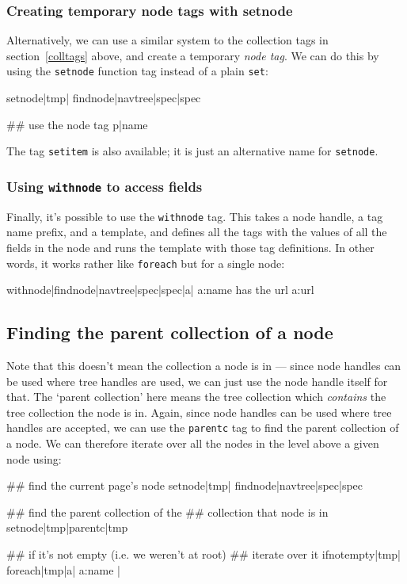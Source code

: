 \subsubsection{Creating temporary node tags with setnode}
\label{usenodetag}
Alternatively, we can use a similar system to the collection tags in section~\ref{colltags} above, and
create a temporary \emph{node tag}. We can do this by using the \texttt{setnode} function tag instead
of a plain \texttt{set}:
\begin{MyVerbatim}
{{setnode|tmp|
    {{findnode|{{navtree}}|spec|{{spec}}}}}}

## use the node tag
{{p|name}}
\end{MyVerbatim}
The tag \texttt{setitem} is also available; it is just an alternative name for \texttt{setnode}.

\subsubsection{Using \texttt{withnode} to access fields}
Finally, it's possible to use the \texttt{withnode} tag. This takes a node handle, a tag name prefix,
and a template, and defines all the tags with the values of all the fields in the node and runs
the template with those tag definitions. In other words, it works rather like \texttt{foreach} but for
a single node:
\begin{MyVerbatim}
{{withnode|{{findnode|{{navtree}}|spec|{{spec}}}}|a|
    {{a:name}} has the url {{a:url}}
}}
\end{MyVerbatim}

\subsection{Finding the parent collection of a node}
Note that this doesn't mean the collection a node is in --- since node handles can be used where
tree handles are used, we can just use the node handle itself for that. The `parent collection' here means
the tree collection which \emph{contains} the tree collection the node is in.
Again, since node handles can be used where tree handles are accepted, we can use the \texttt{parentc}
tag to find the parent collection of a node. We can therefore iterate over all the nodes in the
level above a given node using:
\begin{MyVerbatim}
## find the current page's node
{{setnode|tmp|
    {{findnode|{{navtree}}|spec|{{spec}}}}}}
    
## find the parent collection of the
## collection that node is in
{{setnode|tmp|{{parentc|{{tmp}}}}}}    

## if it's not empty (i.e. we weren't at root)
## iterate over it
{{ifnotempty|{{tmp}}|
    {{foreach|{{tmp}}|a|
        {{a:name}}
    }}
|}}
\end{MyVerbatim}

